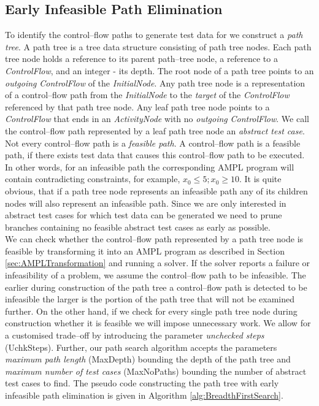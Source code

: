 \documentclass[runningheads,a4paper]{llncs}%
\newcommand{\UMLType}[1]{\textsf{\textit{#1}}} %
\newcommand{\UMLReference}[1]{\textsf{\textit{#1}}} %
\begin{document}
\subsection{Early Infeasible Path Elimination}%
\label{sec:InfeasiblePathElimination}%
To identify the control--flow paths to generate test data for we construct a \emph{path tree}. A path tree is a tree data structure consisting of path tree nodes. Each path tree node holds a reference to its parent path--tree node, a reference to a \UMLType{ControlFlow}, and an integer - its depth. The root node of a path tree points to an \UMLReference{outgoing} \UMLType{ControlFlow} of the \UMLType{InitialNode}. Any path tree node is a representation of a control--flow path from the \UMLType{InitialNode} to the \UMLReference{target} of the \UMLType{ControlFlow} referenced by that path tree node. Any leaf path tree node points to a \UMLType{ControlFlow} that ends in an \UMLType{ActivityNode} with no \UMLReference{outgoing} \UMLType{ControlFlow}. We call the control--flow path represented by a leaf path tree node an \emph{abstract test case}.\\
Not every control--flow path is a \emph{feasible path}. A control--flow path is a feasible path, if there exists test data that causes this control--flow path to be executed. In other words, for an infeasible path the corresponding AMPL program will contain contradicting constraints, for example, $x_0\leq5; x_0\geq10$. It is quite obvious, that if a path tree node represents an infeasible path any of its children nodes will also represent an infeasible path. Since we are only interested in abstract test cases for which test data can be generated we need to prune branches containing no feasible abstract test cases as early as possible.\\
We can check whether the control--flow path represented by a path tree node is feasible by transforming it into an AMPL program as described in Section \ref{sec:AMPLTransformation} and running a solver. If the solver reports a failure or infeasibility of a problem, we assume the control--flow path to be infeasible. The earlier during construction of the path tree a control--flow path is detected to be infeasible the larger is the portion of the path tree that will not be examined further. On the other hand, if we check for every single path tree node during construction whether it is feasible we will impose unnecessary work. We allow for a customised trade--off by introducing the parameter \emph{unchecked steps} (UchkSteps). Further, our path search algorithm accepts the parameters \emph{maximum path length} (MaxDepth) bounding the depth of the path tree and \emph{maximum number of test cases} (MaxNoPaths) bounding the number of abstract test cases to find. The pseudo code constructing the path tree  with early infeasible path elimination is given in Algorithm \ref{alg:BreadthFirstSearch}.%
\end{document}

